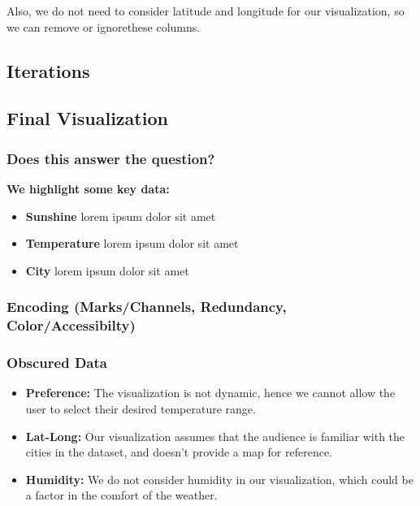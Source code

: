 \documentclass{article}
\begin{document}
Also, we do not need to consider latitude and longitude for our visualization, so we can remove or ignorethese columns.

\subsection{Iterations}

\subsection{Final Visualization}
\subsubsection{Does this answer the question?}

\textbf{We highlight some key data:}
\begin{itemize}
    \item \textbf{Sunshine} lorem ipsum dolor sit amet  
    \item \textbf{Temperature} lorem ipsum dolor sit amet
    \item \textbf{City} lorem ipsum dolor sit amet
\end{itemize}

\subsubsection{Encoding (Marks/Channels, Redundancy, Color/Accessibilty)}
\subsubsection{Obscured Data}
    \begin{itemize}
        \item \textbf{Preference:} The visualization is not dynamic, hence we cannot allow the user to select their desired temperature range.
        \item \textbf{Lat-Long:} Our visualization assumes that the audience is familiar with the cities in the dataset, and doesn't provide a map for reference.
        \item \textbf{Humidity:} We do not consider humidity in our visualization, which could be a factor in the comfort of the weather.
    \end{itemize}



\end{document}
